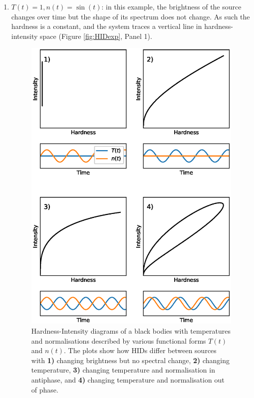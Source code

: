 \begin{enumerate}
\item $T(t)=1, n(t)=\sin(t)$: in this example, the brightness of the source changes over time but the shape of its spectrum does not change.  As such the hardness is a constant, and the system traces a vertical line in hardness-intensity space (Figure \ref{fig:HIDexp}, Panel 1).
\begin{figure}
    \includegraphics[width=\columnwidth, trim = 0mm 25mm 0mm 25mm]{images/hidexp.eps}
    \captionsetup{singlelinecheck=off}
    \caption{Hardness-Intensity diagrams of a black bodies with temperatures and normalisations described by various functional forms $T(t)$ and $n(t)$.  The plots show how HIDs differ between sources with \textbf{1)} changing brightness but no spectral change, \textbf{2)} changing temperature, \textbf{3)} changing temperature and normalisation in antiphase, and \textbf{4)} changing temperature and normalisation out of phase.}

\end{figure}
\end{enumerate}
